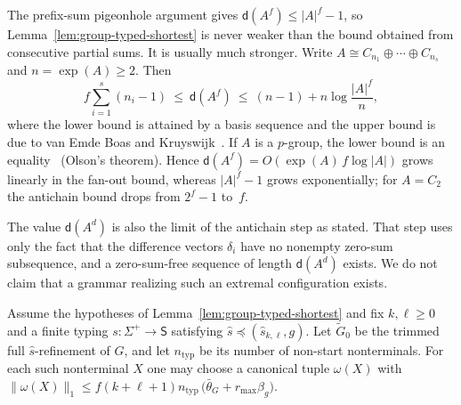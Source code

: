 \begin{remark}
\label{rem:davenport-size}
The prefix-sum pigeonhole argument gives
$\mathsf d(A^f)\le|A|^f-1$, so
Lemma~\ref{lem:group-typed-shortest} is never weaker
than the bound obtained from consecutive partial sums.
It is usually much stronger.  Write
$A\cong C_{n_1}\oplus\cdots\oplus C_{n_s}$ and
$n=\exp(A)\ge2$. Then
\[
 f\sum_{i=1}^{s}(n_i-1)\ \le\ \mathsf d(A^f)\ \le\
 (n-1)+n\log\frac{|A|^f}{n},
\]
where the lower bound is attained by a basis
sequence and the upper bound is due to van Emde Boas
and Kruyswijk~\cite[Proposition~5.1.8 and Theorem~5.5.5]{GeroldingerHalterKoch2006}.
If $A$ is a $p$-group, the lower bound is an
equality~\cite[Theorem~5.5.9]{GeroldingerHalterKoch2006}
(Olson's theorem).
Hence $\mathsf d(A^f)=O(\exp(A)\,f\log|A|)$ grows
linearly in the fan-out bound, whereas $|A|^f-1$ grows
exponentially; for $A=C_2$ the antichain bound drops
from $2^f-1$ to~$f$.

The value $\mathsf d(A^d)$ is also the limit of the
antichain step as stated.  That step uses only the
fact that the difference vectors $\delta_i$ have no
nonempty zero-sum subsequence, and a zero-sum-free
sequence of length $\mathsf d(A^d)$ exists.  We do not
claim that a grammar realizing such an extremal
configuration exists.
\end{remark}

\begin{lemma}
\label{lem:window-abelian-short}
Assume the hypotheses of
Lemma~\ref{lem:group-typed-shortest} and fix
$k,\ell\ge0$ and a finite typing
$s:\Sigma^+\to\mathsf S$ satisfying
$\widehat{s}\preceq(\widehat{s}_{k,\ell},g)$.
Let $\widetilde G_0$ be the trimmed
full $\widehat{s}$-refinement of $G$, and let
$n_{\mathrm{typ}}$ be its number of
non-start nonterminals. For each such
nonterminal $X$ one may choose a
canonical tuple $\omega(X)$ with
\(\|\omega(X)\|_1\le f(k+\ell+1)n_{\mathrm{typ}}\, \bigl(\bar\theta_G+r_{\max}\beta_g\bigr).\)
\end{lemma}

